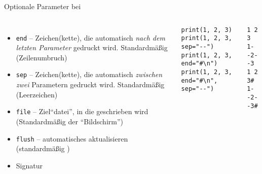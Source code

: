 \begin{frame}[fragile]{Optionale Parameter bei }
%
\begin{columns}[T]
\begin{itemize}
\item \texttt{end} -- Zeichen(kette), die automatisch \emph{nach dem letzten Parameter} gedruckt wird. Standardmäßig  (Zeilenumbruch)
\item \texttt{sep} -- Zeichen(kette), die automatisch \emph{zwischen zwei} Parametern gedruckt wird. Standardmäßig  (Leerzeichen)
\item \texttt{file} -- Ziel\enquote{datei}, in die geschrieben wird (Standardmäßig der \enquote{Bildschirm})
\item \texttt{flush} -- automatisches aktualisieren (standardmäßig )
\item Signatur 
\end{itemize}
%
\begin{codebox}
\begin{verbatim}
print(1, 2, 3)
print(1, 2, 3, sep="--")
print(1, 2, 3, end="#\n")
print(1, 2, 3, end="#\n", sep="--")
\end{verbatim}
\end{codebox}
%
\begin{cmdbox}
\begin{verbatim}
1 2 3
1--2--3
1 2 3#
1--2--3#
\end{verbatim}
\end{cmdbox}
\end{columns}
%
\end{frame}


